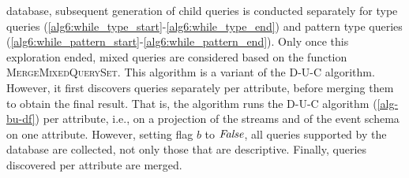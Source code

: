 database, subsequent generation of child queries is conducted separately for
type queries (\autoref{alg6:while_type_start}-\ref{alg6:while_type_end}) and
pattern type queries
(\autoref{alg6:while_pattern_start}-\ref{alg6:while_pattern_end}).
Only once this exploration ended, mixed queries are
considered based on the function \textsc{MergeMixedQuerySet}.
This algorithm is a variant of the D-U-C algorithm.
However, it first discovers queries separately per attribute, before merging
them to obtain the
final result. That is, the algorithm runs the D-U-C algorithm
(\autoref{alg-bu-df}) per attribute, i.e., on a projection of the streams
and of the event schema on one attribute. However, setting flag $b$ to
$\mathit{False}$, all queries supported by the database are collected, not only
those that are descriptive.
Finally, queries discovered per attribute are merged.
